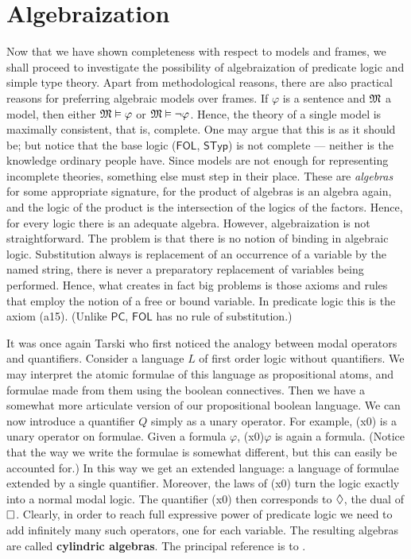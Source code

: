 \section{Algebraization}
\label{kap6-4b}
Now that we have shown completeness with respect to models and
frames, we shall proceed to investigate the possibility of
algebraization of predicate logic and simple type theory. Apart
from methodological reasons, there are also practical reasons for
preferring algebraic models over frames. If $\varphi$ is a
sentence and $\mathfrak{M}$ a model, then either $\mathfrak{M} \vDash \varphi$ or
$\mathfrak{M} \vDash \neg\varphi$. Hence, the theory of a single model is
maximally consistent, that is, complete. One may argue that this
is as it should be; but notice that the base logic ($\mathsf{FOL}$,
$\mathsf{STyp}$) is not complete --- neither is the knowledge
ordinary people have. Since models are not enough for representing
incomplete theories, something else must step in their place.
These are {\it algebras\/} for some appropriate signature, for the
product of algebras is an algebra again, and the logic of the
product is the intersection of the logics of the factors. Hence,
for every logic there is an adequate algebra. However,
algebraization is not straightforward. The problem is that there
is no notion of binding in algebraic logic. Substitution always is
replacement of an occurrence of a variable by the named string,
there is never a preparatory replacement of variables being
performed. Hence, what creates in fact big problems is those
axioms and rules that employ the notion of a free or bound
variable. In predicate logic this is the axiom (a15). (Unlike 
$\mathsf{PC}$, $\mathsf{FOL}$ has no rule of substitution.)

It was once again Tarski who first noticed the analogy between
modal operators and quantifiers. Consider a language $L$ of first
order logic without quantifiers. We may interpret the atomic
formulae of this language as propositional atoms, and formulae
made from them using the boolean connectives. Then we have a
somewhat more articulate version of our propositional boolean
language. We can now introduce a quantifier $Q$ simply as a unary
operator. For example, {\mtt (x0)} is a unary operator
on formulae. Given a formula $\varphi$, {\mtt (x0)$\varphi$}
is again a formula. (Notice that the way we write the formulae is 
somewhat different, but this can easily be accounted for.) In this 
way we get an extended language: a language of formulae extended by 
a single quantifier. Moreover, the laws of {\mtt (x0)} turn 
the logic exactly into a normal modal logic. The quantifier 
{\mtt (x0)} then corresponds to $\lozenge$, the dual of $\square$. 
Clearly, in order to reach full expressive power of predicate logic 
we need to add infinitely many such operators, one for each variable. 
The resulting algebras are called \textbf{cylindric algebras}. The
principal reference is to \cite{henkinmonktarski:cylindric1}.

